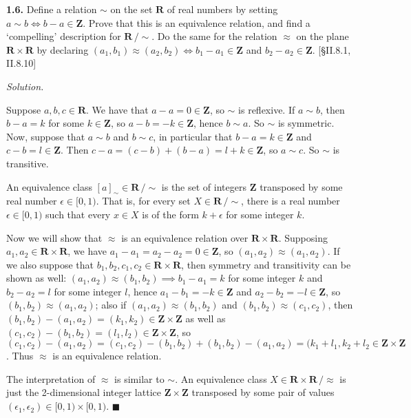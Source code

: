 \documentclass[14pt,parskip=full]{scrartcl}
\newcommand{\exercise}[3]{
\noindent
\textbf{#1.} #2

\noindent
\textit{Solution.}{\let\tpar\par \let\par\relax #3}
}
\newcommand*{\QEDA}{\hfill\ensuremath{\blacksquare}}
\begin{document}
\exercise
{1.6}{Define a relation $\sim$ on the set $\mathbf{R}$ of real numbers by
setting $a\sim b\iff b-a\in\mathbf{Z}$. Prove that this is an equivalence
relation, and find a `compelling' description for $\mathbf{R}\,/\!\sim$. Do the
same for the relation $\approx$ on the plane $\mathbf{R}\times\mathbf{R}$ by
declaring $(a_1,b_1)\approx(a_2,b_2)\iff b_1-a_1\in\mathbf{Z}$ and
$b_2-a_2\in\mathbf{Z}$. [\S II.8.1, II.8.10]}{

Suppose $a,b,c\in\mathbf{R}$. We have that $a-a=0\in\mathbf{Z}$, so $\sim$ is
reflexive. If $a\sim b$, then $b-a=k$ for some $k\in\mathbf{Z}$, so
$a-b=-k\in\mathbf{Z}$, hence $b\sim a$. So $\sim$ is symmetric. Now, suppose that
$a\sim b$ and $b\sim c$, in particular that $b-a=k\in\mathbf{Z}$ and
$c-b=l\in\mathbf{Z}$. Then $c-a=(c-b) + (b-a) = l+k\in\mathbf{Z}$, so $a\sim c$.
So $\sim$ is transitive.

\tpar
An equivalence class $[a]_{\sim}\in\mathbf{R}\,/\!\sim$ is the set of integers
$\mathbf{Z}$ transposed by some real number $\epsilon\in[0,1)$. That is, for
every set $X\in\mathbf{R}\,/\!\sim$, there is a real number $\epsilon\in[0,1)$
such that every $x\in X$ is of the form $k+\epsilon$ for some integer $k$.

\tpar
Now we will show that $\approx$ is an equivalence relation over
$\mathbf{R}\times\mathbf{R}$. Supposing $a_1,a_2\in\mathbf{R}\times\mathbf{R}$,
we have $a_1-a_1=a_2-a_2=0\in\mathbf{Z}$, so $(a_1,a_2)\approx(a_1,a_2)$. If we
also suppose that $b_1,b_2,c_1,c_2\in\mathbf{R}\times\mathbf{R}$, then symmetry
and transitivity can be shown as well: $(a_1,a_2)\approx(b_1,b_2)\implies
b_1-a_1=k$ for some integer $k$ and $b_2-a_2=l$ for some integer $l$, hence
$a_1-b_1=-k\in\mathbf{Z}$ and $a_2-b_2=-l\in\mathbf{Z}$, so
$(b_1,b_2)\approx(a_1,a_2)$; also if $(a_1,a_2)\approx(b_1,b_2)$ and
$(b_1,b_2)\approx(c_1,c_2)$, then
$(b_1,b_2)-(a_1,a_2)=(k_1,k_2)\in\mathbf{Z}\times\mathbf{Z}$ as well as
$(c_1,c_2)-(b_1,b_2)=(l_1,l_2)\in\mathbf{Z}\times\mathbf{Z}$, so $(c_1,c_2) -
(a_1,a_2) = (c_1,c_2) - (b_1,b_2) + (b_1,b_2) - (a_1,a_2) = (k_1+l_1,
k_2+l_2\in\mathbf{Z}\times\mathbf{Z}$. Thus $\approx$ is an equivalence
relation.

\tpar
The interpretation of $\approx$ is similar to $\sim$. An equivalence class
$X\in\mathbf{R}\times\mathbf{R}\,/\approx$ is just the 2-dimensional integer
lattice $\mathbf{Z}\times\mathbf{Z}$ transposed by some pair of values
$(\epsilon_1,\epsilon_2)\in[0,1)\times[0,1)$.
\QEDA

}
\end{document}
